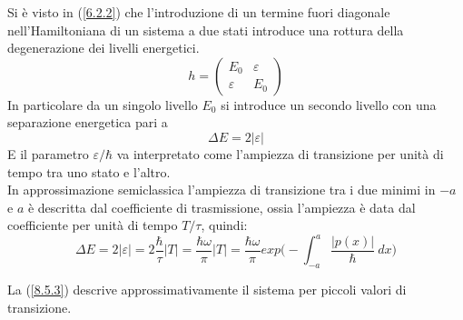 \documentclass[twoside]{article}
\begin{document}
Si è visto in (\ref{6.2.2}) che l'introduzione di un termine fuori diagonale nell'Hamiltoniana di un sistema a due stati introduce una rottura della degenerazione dei livelli energetici.
\begin{equation}
    h=\begin{pmatrix}
     E_0 & \varepsilon \\
    \varepsilon & E_0 
    \end{pmatrix}
\end{equation}
In particolare da un singolo livello $E_0$ si introduce un secondo livello con una separazione energetica pari a
\begin{equation}
    \Delta E= 2 |\varepsilon|
\end{equation}
E il parametro $\varepsilon / \hbar$ va interpretato come l'ampiezza di transizione per unità di tempo tra uno stato e l'altro.
\\
In approssimazione semiclassica l'ampiezza di transizione tra i due minimi in $-a$ e $a$ è descritta dal coefficiente di trasmissione, ossia l'ampiezza è data dal coefficiente per unità di tempo $T/\tau$, quindi:
\begin{equation} \label{8.5.3}
    \Delta E =2|\varepsilon|=2\frac{\hbar}{\tau}|T|=\frac{\hbar \omega}{\pi}|T|=\frac{\hbar \omega}{\pi}exp\biggl( -\int_{-a} ^{a} \frac{|p(x)|}{\hbar} \ dx \biggr)
\end{equation}

La (\ref{8.5.3}) descrive approssimativamente il sistema per piccoli valori di transizione.

\vspace{0.5cm}
\end{document}
